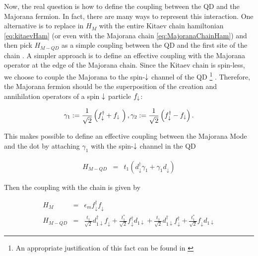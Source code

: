 Now, the real question is how to define the coupling between the QD and the Majorana fermion. In fact, there are many ways to represent this interaction. One alternative is to replace in $H_{M}$ with the entire Kitaev chain hamiltonian \eqref{eq:kitaevHam} (or  even with the  Majorana chain \eqref{eq:MajoranaChainHam}) and then pick $H_{M-QD}$ as a simple coupling between the QD and the first site of the chain \cite{vernek_subtle_2014}.  A simpler approach is  to define an effective coupling with the Majorana operator at the edge of the Majorana chain. Since the Kitaev chain is spin-less, we choose to couple the Majorana to the spin-$\downarrow$ channel of the QD \footnote{An appropriate justification of this fact can be found in \cite{ruiz-tijerina_interaction_2015}} . Therefore, the Majorana fermion should be the superposition of the creation and annihilation operators of a spin $\downarrow$ particle $f_\downarrow$:

$$\gamma_1 := \frac{1}{\sqrt{2}} \left( f^\dagger_{\downarrow} + f_{\downarrow}\ \right) , \gamma_2 := \frac{1}{\sqrt{2}} \left( f^\dagger_{\downarrow} - f_{\downarrow} \right).$$

This makes possible to define an effective coupling between the Majorana Mode and the dot by attaching $\gamma_1$ with the spin-$\downarrow$ channel in the QD

\begin{eqnarray}
H_{M-QD} & = &  t_1 \left(d_{\downarrow}^{\dagger}\gamma_{1}+\gamma_{1}d_{\downarrow}\right) 
\label{eq:MajoranaCoupling}
\end{eqnarray}





Then the coupling with the chain is given by 

\begin{eqnarray*}
H_{M} & = & \epsilon_{m}f_{\downarrow}^{\dagger}f_{\downarrow}\\
H_{M-QD}&=&\frac{t_1}{\sqrt{2}}d_{1\downarrow}^{\dagger}f_{\downarrow}+\frac{t_1^{*}}{\sqrt{2}}f_{\downarrow}^{\dagger}d_{1\downarrow}+\frac{t_1}{\sqrt{2}}d_{1\downarrow}^{\dagger}f_{\downarrow}^{\dagger}+\frac{t_1^{*}}{\sqrt{2}}f_{\downarrow}d_{1\downarrow}
\end{eqnarray*}

